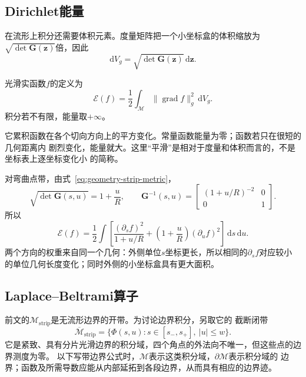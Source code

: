 \subsection{Dirichlet能量}

在流形上积分还需要体积元素。度量矩阵把一个小坐标盒的体积缩放为
$\sqrt{\det\bm{G}(\bm{z})}$倍，因此
\[
  \mathrm{d}V_g
  =
  \sqrt{\det\bm{G}(\bm{z})}\,\mathrm{d}\bm{z}.
\]
\begin{definition}[Dirichlet能量]
\label{def:geometry-dirichlet-energy}
光滑实函数$f$的定义为
\begin{equation}
  \mathcal{E}(f)
  =
  \frac12
  \int_{\mathcal{M}}
  \lVert\operatorname{grad}f\rVert_g^2
  \,\mathrm{d}V_g.
  \label{eq:geometry-dirichlet-energy}
\end{equation}
积分若不有限，能量取$+\infty$。
\end{definition}
它累积函数在各个切向方向上的平方变化。常量函数能量为零；函数若只在很短的几何距离内
剧烈变化，能量就大。这里“平滑”是相对于度量和体积而言的，不是坐标表上逐坐标变化小
的简称。

对弯曲点带，由式~\eqref{eq:geometry-strip-metric}，
\[
  \sqrt{\det\bm{G}(s,u)}
  =
  1+\frac{u}{R},
  \qquad
  \bm{G}^{-1}(s,u)
  =
  \begin{bmatrix}
    (1+u/R)^{-2}&0\\
    0&1
  \end{bmatrix}.
\]
所以
\begin{equation}
  \mathcal{E}(f)
  =
  \frac12
  \int
  \left[
    \frac{(\partial_sf)^2}{1+u/R}
    +
    \left(1+\frac{u}{R}\right)(\partial_uf)^2
  \right]
  \,\mathrm{d}s\,\mathrm{d}u.
  \label{eq:geometry-strip-dirichlet-energy}
\end{equation}
两个方向的权重来自同一个几何：外侧单位$s$坐标更长，所以相同的$\partial_sf$对应较小
的单位几何长度变化；同时外侧的小坐标盒具有更大面积。

\subsection{Laplace--Beltrami算子}

前文的$\mathcal{M}_{\mathrm{strip}}$是无流形边界的开带。为讨论边界积分，另取它的
截断闭带
\[
  \overline{\mathcal{M}}_{\mathrm{strip}}
  =
  \{\Phi(s,u):s\in[s_-,s_+],\ |u|\leq w\}.
\]
它是紧致、具有分片光滑边界的积分域，四个角点的外法向不唯一，但这些点的边界测度为零。
以下写带边界公式时，$\mathcal{M}$表示这类积分域，$\partial\mathcal{M}$表示积分域的
边界；函数及所需导数应能从内部延拓到各段边界，从而具有相应的边界迹。

